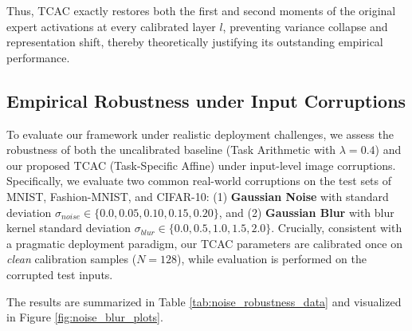\documentclass{article}
\theoremstyle{plain}
\theoremstyle{definition}
\theoremstyle{remark}
\begin{document}
Thus, TCAC exactly restores both the first and second moments of the original expert activations at every calibrated layer $l$, preventing variance collapse and representation shift, thereby theoretically justifying its outstanding empirical performance.

\subsection{Empirical Robustness under Input Corruptions}
\label{sec:appendix_noise}

To evaluate our framework under realistic deployment challenges, we assess the robustness of both the uncalibrated baseline (Task Arithmetic with $\lambda=0.4$) and our proposed TCAC (Task-Specific Affine) under input-level image corruptions. Specifically, we evaluate two common real-world corruptions on the test sets of MNIST, Fashion-MNIST, and CIFAR-10: (1) \textbf{Gaussian Noise} with standard deviation $\sigma_{noise} \in \{0.0, 0.05, 0.10, 0.15, 0.20\}$, and (2) \textbf{Gaussian Blur} with blur kernel standard deviation $\sigma_{blur} \in \{0.0, 0.5, 1.0, 1.5, 2.0\}$. Crucially, consistent with a pragmatic deployment paradigm, our TCAC parameters are calibrated once on \textit{clean} calibration samples ($N=128$), while evaluation is performed on the corrupted test inputs.

The results are summarized in Table \ref{tab:noise_robustness_data} and visualized in Figure \ref{fig:noise_blur_plots}.
\end{document}
